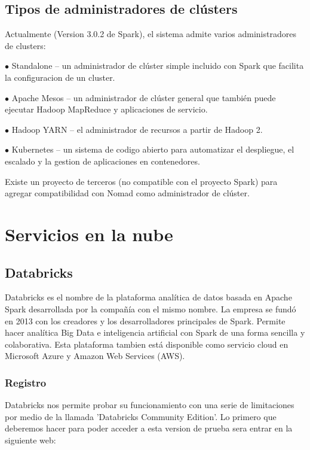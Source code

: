 \documentclass[a4paper,10pt]{article}
\begin{document}
\subsection{Tipos de administradores de clústers}

Actualmente (Version 3.0.2 de Spark), el sistema admite varios administradores de clusters:

$\bullet$ Standalone – un administrador de clúster simple incluido con Spark que facilita la configuracion de un cluster.

$\bullet$ Apache Mesos – un administrador de clúster general que también puede ejecutar Hadoop MapReduce y aplicaciones de servicio.

$\bullet$ Hadoop YARN – el administrador de recursos a partir de Hadoop 2.

$\bullet$ Kubernetes – un sistema de codigo abierto para automatizar el despliegue, el escalado y la gestion de aplicaciones en contenedores.

Existe un proyecto de terceros (no compatible con el proyecto Spark) para agregar compatibilidad con Nomad como administrador de clúster.





\section{Servicios en la nube}

\subsection{Databricks}

Databricks es el nombre de la plataforma analítica de datos basada en Apache Spark desarrollada por la compañía con el mismo nombre. La empresa se fundó en 2013 con los creadores y los desarrolladores principales de Spark. Permite hacer analítica Big Data e inteligencia artificial con Spark de una forma sencilla y colaborativa. Esta plataforma tambien está disponible como servicio cloud en Microsoft Azure y Amazon Web Services (AWS).

\subsubsection{Registro}

Databricks nos permite probar su funcionamiento con una serie de limitaciones por medio de la llamada 'Databricks Community Edition'. Lo primero que deberemos hacer para poder acceder a esta version de prueba sera entrar en la siguiente web:
\end{document}
